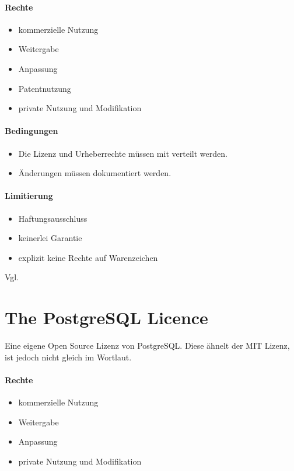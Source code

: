 \paragraph{Rechte}
\begin{itemize}
    \item kommerzielle Nutzung
    \item Weitergabe
    \item Anpassung
    \item Patentnutzung %
    \item private Nutzung und Modifikation
\end{itemize}

\paragraph{Bedingungen}
\begin{itemize}
    \item Die Lizenz und Urheberrechte müssen mit verteilt werden.
    \item Änderungen müssen dokumentiert werden.
\end{itemize}

\paragraph{Limitierung}
\begin{itemize}
    \item Haftungsausschluss
    \item keinerlei Garantie
    \item explizit keine Rechte auf Warenzeichen
\end{itemize}
Vgl. \cite{choosealicense-com}

\section{The PostgreSQL Licence}\label{sec:the-postgresql-licence}
Eine eigene Open Source Lizenz von PostgreSQL.
Diese ähnelt der MIT Lizenz, ist jedoch nicht gleich im Wortlaut.

\paragraph{Rechte}
\begin{itemize}
    \item kommerzielle Nutzung
    \item Weitergabe
    \item Anpassung
    \item private Nutzung und Modifikation
\end{itemize}

